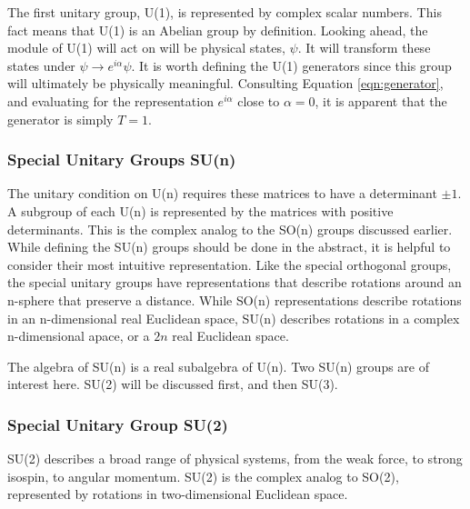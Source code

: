 The first unitary group, U(1), is represented by complex scalar numbers.
This fact means that U(1) is an Abelian group by definition.
Looking ahead, the module of U(1) will act on will be physical states, $\psi$.
It will transform these states under $\psi\to e^{i\alpha}\psi$.
It is worth defining the U(1) generators since this group will ultimately be physically meaningful.
Consulting Equation \ref{eqn:generator}, and evaluating for the representation $e^{i\alpha}$ close to $\alpha=0$, it is apparent that the generator is simply $T=1$.

\subsubsection{Special Unitary Groups SU(n)}\label{sec:specialUnitary}
The unitary condition on U(n) requires these matrices to have a determinant $\pm1$.
A subgroup of each U(n) is represented by the matrices with positive determinants.
This is the complex analog to the SO(n) groups discussed earlier.
While defining the SU(n) groups should be done in the abstract, it is helpful to consider their most intuitive representation.
Like the special orthogonal groups, the special unitary groups have representations that describe rotations around an n-sphere that preserve a distance.
While SO(n) representations describe rotations in an n-dimensional real Euclidean space, SU(n) describes rotations in a complex n-dimensional apace, or a $2n$ real Euclidean space. \check

The algebra of SU(n) is a real subalgebra of U(n).
Two SU(n) groups are of interest here. 
SU(2) will be discussed first, and then SU(3).

\subsubsection{Special Unitary Group SU(2)}
SU(2) describes a broad range of physical systems, from the weak force, to strong isospin, to angular momentum.
SU(2) is the complex analog to SO(2), represented by rotations in two-dimensional Euclidean space.

